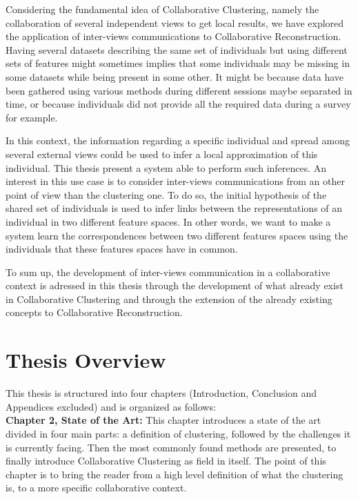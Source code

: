 Considering the fundamental idea of Collaborative Clustering, namely the collaboration of several independent views to get local results, we have explored the application of inter-views communications to Collaborative Reconstruction. Having several datasets describing the same set of individuals but using different sets of features might sometimes implies that some individuals may be missing in some datasets while being present in some other. It might be because data have been gathered using various methods during different sessions maybe separated in time, or because individuals did not provide all the required data during a survey for example. 

In this context, the information regarding a specific individual and spread among several external views could be used to infer a local approximation of this individual. This thesis present a system able to perform such inferences. An interest in this use case is to consider inter-views communications from an other point of view than the clustering one. To do so, the initial hypothesis of the shared set of individuals is used to infer links between the representations of an individual in two different feature spaces. In other words, we want to make a system learn the correspondences between two different features spaces using the individuals that these features spaces have in common.

To sum up, the development of inter-views communication in a collaborative context is adressed in this thesis through the development of what already exist in Collaborative Clustering and through the extension of the already existing concepts to Collaborative Reconstruction.

\section{Thesis Overview}

This thesis is structured into four chapters (Introduction, Conclusion and Appendices excluded) and is organized as follows:\\

\textbf{Chapter 2, State of the Art:} This chapter introduces a state of the art divided in four main parts: a definition of clustering, followed by the challenges it is currently facing. Then the most commonly found methods are presented, to finally introduce Collaborative Clustering as field in itself. The point of this chapter is to bring the reader from a high level definition of what the clustering is, to a more specific collaborative context.\\

